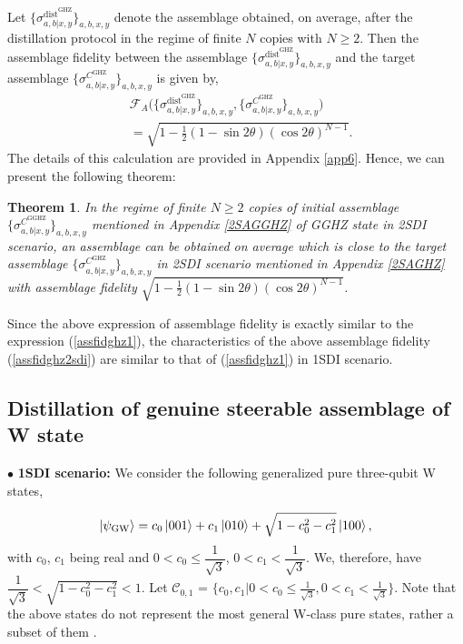 \documentclass[reprint,superscriptaddress,nofootinbib,amsmath,amssymb,aps,pra,longbibliography]{revtex4-1}
\newtheorem{thm}{Theorem}
\begin{document}
 Let $\{\sigma_{a,b|x,y}^{\text{dist}^{\text{GHZ}}} \}_{a,b,x,y}$ denote the assemblage  obtained, on average, after the distillation protocol in the regime of finite $N$ copies with $N \geq 2$. Then the assemblage fidelity between the assemblage $\{\sigma_{a,b|x,y}^{\text{dist}^{\text{GHZ}}}\}_{a,b,x,y}$ and the target assemblage $\{\sigma_{a,b|x,y}^{C^{\text{GHZ}}}\}_{a,b,x,y}$ is given by,
\begin{align}
    &\mathcal{F}_A \Big(\{\sigma_{a,b|x,y}^{\text{dist}^{\text{GHZ}}}\}_{a,b,x,y}, \{\sigma_{a,b|x,y}^{C^{\text{GHZ}}}\}_{a,b,x,y} \Big)  \nonumber \\
    &=\sqrt{1 - \frac{1}{2} (1 - \sin 2 \theta ) (\cos 2 \theta )^{N-1}}.
     \label{assfidghz2sdi}
\end{align}
The details of this calculation are provided in Appendix \ref{app6}. Hence, we can present the following theorem:
\begin{thm}
In the regime of finite $N \geq 2$ copies of initial assemblage $\{\sigma_{a,b|x,y}^{C^{\text{GGHZ}}}\}_{a,b,x,y}$ mentioned in Appendix \ref{2SAGGHZ} of GGHZ state in 2SDI scenario, an assemblage can be obtained on average which is close to the target assemblage $\{ \sigma_{a,b|x,y}^{C^{\text{GHZ}}} \}_{a,b,x,y}$ in 2SDI scenario mentioned in Appendix \ref{2SAGHZ} with assemblage fidelity $\sqrt{1 - \frac{1}{2} (1 - \sin 2 \theta ) (\cos 2 \theta )^{N-1}}$.
\end{thm}

Since the above expression of assemblage fidelity is exactly similar to the expression (\ref{assfidghz1}), the characteristics of the above assemblage fidelity (\ref{assfidghz2sdi}) are similar to that of (\ref{assfidghz1}) in 1SDI scenario.





\subsection{Distillation of genuine steerable assemblage of W state}\label{subsection2}

$\bullet$ {\bf 1SDI scenario:} We consider the following generalized pure three-qubit W states,

\begin{equation}
	|\psi_\text{GW} \rangle = c_0\ket{001} + c_1\ket{010} + \sqrt{1-c_0^2-c_1^2} \ket{100} ,
\label{wclass}
\end{equation}
with $c_0$, $c_1$ being real and $0 < c_0 \leq \dfrac{1}{\sqrt{3}}$, $0 < c_1 < \dfrac{1}{\sqrt{3}}$. We, therefore, have $\dfrac{1}{\sqrt{3}} < \sqrt{1-c_0^2-c_1^2} < 1$. 
 Let $\mathcal{C}_{0,1}$ = $\{c_0, c_1|0 < c_0 \leq \frac{1}{\sqrt{3}}, 0 < c_1 < \frac{1}{\sqrt{3}} \}$. Note that the above states do not represent the most general W-class pure states, rather a subset of them \cite{ALS1}.
\end{document}
